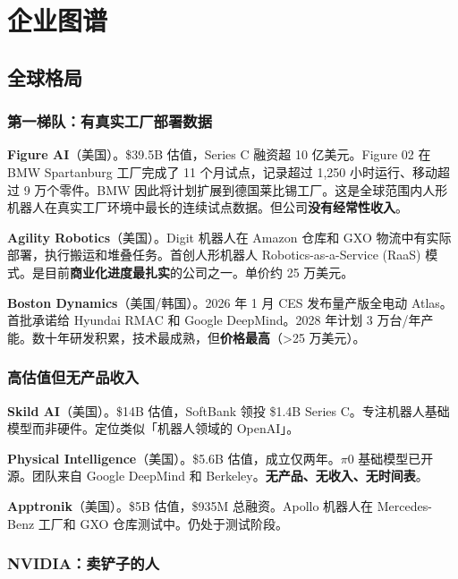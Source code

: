 \chapter{企业图谱}
\label{ch:landscape}

\section{全球格局}

\subsection{第一梯队：有真实工厂部署数据}

\textbf{Figure AI}（美国）。\$39.5B 估值，Series C 融资超 10 亿美元。Figure 02 在 BMW Spartanburg 工厂完成了 11 个月试点，记录超过 1,250 小时运行、移动超过 9 万个零件\cite{figure2026bmw}。BMW 因此将计划扩展到德国莱比锡工厂。这是全球范围内人形机器人在真实工厂环境中最长的连续试点数据。但公司\textbf{没有经常性收入}。

\textbf{Agility Robotics}（美国）。Digit 机器人在 Amazon 仓库和 GXO 物流中有实际部署\cite{agility2025amazon}，执行搬运和堆叠任务。首创人形机器人 Robotics-as-a-Service (RaaS) 模式。是目前\textbf{商业化进度最扎实}的公司之一。单价约 25 万美元。

\textbf{Boston Dynamics}（美国/韩国）。2026 年 1 月 CES 发布量产版全电动 Atlas\cite{bd2026atlas}。首批承诺给 Hyundai RMAC 和 Google DeepMind。2028 年计划 3 万台/年产能。数十年研发积累，技术最成熟，但\textbf{价格最高}（>25 万美元）。

\subsection{高估值但无产品收入}

\textbf{Skild AI}（美国）。\$14B 估值，SoftBank 领投 \$1.4B Series C\cite{skild2026seriesc}。专注机器人基础模型而非硬件。定位类似「机器人领域的 OpenAI」。

\textbf{Physical Intelligence}（美国）。\$5.6B 估值，成立仅两年。$\pi$0 基础模型已开源。团队来自 Google DeepMind 和 Berkeley。\textbf{无产品、无收入、无时间表}\cite{pi2025seriesb}。

\textbf{Apptronik}（美国）。\$5B 估值，\$935M 总融资。Apollo 机器人在 Mercedes-Benz 工厂和 GXO 仓库测试中\cite{apptronik2026}。仍处于测试阶段。

\subsection{NVIDIA：卖铲子的人}

